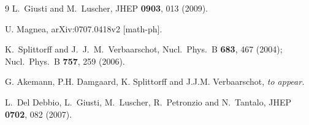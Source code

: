 \documentclass[aps,prl,twocolumn,superscriptaddress,preprintnumbers,floatfix,nofootinbib]{revtex4}
\begin{document}
\begin{thebibliography}{9}
  L.~Giusti and M.~Luscher,
  JHEP {\bf 0903}, 013 (2009).


 U. Magnea, 
        arXiv:0707.0418v2 [math-ph].


  K.~Splittorff and J.~J.~M.~Verbaarschot,
  Nucl.\ Phys.\  B {\bf 683}, 467 (2004);
  Nucl.\ Phys.\  B {\bf 757}, 259 (2006).

G. Akemann, P.H. Damgaard, K. Splittorff and
  J.J.M. Verbaarschot, {\it to appear.}

  L.~Del Debbio, L.~Giusti, M.~Luscher, R.~Petronzio and N.~Tantalo,
  JHEP {\bf 0702}, 082 (2007).


\end{thebibliography}
\end{document}
